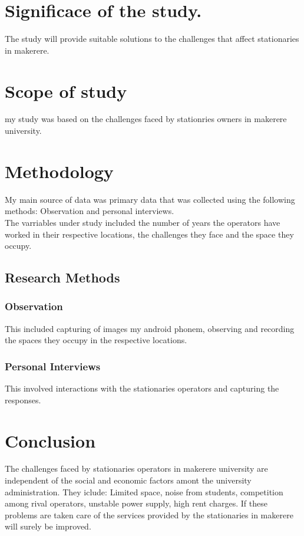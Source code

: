 \documentclass[a4paper,10pt]{article}
\begin{document}
\section{Significace of the study.}
The study will provide suitable solutions to the challenges that affect stationaries in makerere.
\section{Scope of study}
my study was based on the challenges faced by stationries owners in makerere university.

\section{Methodology}
My main source of data was primary data that was collected using the following methods: Observation and personal interviews.\\
The varriables under study included the number of years the operators have worked in their respective locations, the challenges they face and the space they occupy.
\subsection{Research Methods}
\subsubsection{Observation}
This included capturing of images my android phonem, observing and recording the spaces they occupy in the respective locations. 
\subsubsection{Personal Interviews}
This involved interactions with the stationaries operators and capturing the responses.
\section{Conclusion}
The challenges faced by stationaries operators in makerere university are independent of the social and economic factors amont the university administration. They iclude: Limited space, noise from students, competition among rival operators, unstable power supply, high rent charges. If these problems are taken care of the services provided by the stationaries in makerere will surely be improved. 
\begin{thebibliography}{1}

\end{thebibliography}
\end{document}

